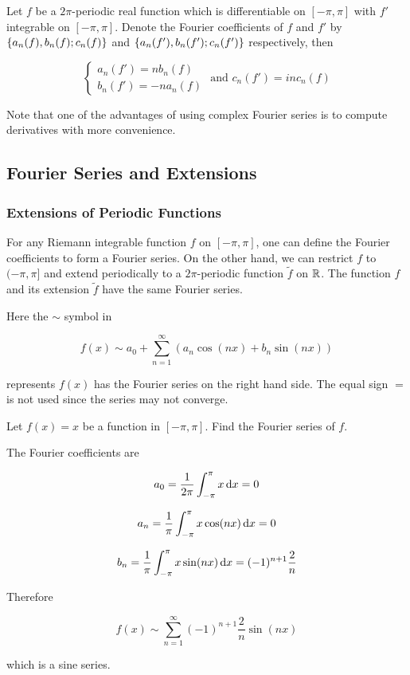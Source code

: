 \documentclass[a4paper,12pt]{article}
\begin{document}
\begin{pst}
  Let $f$ be a $2\pi$-periodic real function which is differentiable on $[-\pi,\pi]$ with $f'$ integrable on $[-\pi,\pi]$. Denote the Fourier coefficients of $f$ and $f'$ by $\left\{ a_{n}(f), b_{n}(f); c_{n}(f)\right\}$ and $\left\{ a_{n}(f'), b_{n}(f'); c_{n}(f')\right\}$ respectively, then
  
  $$\begin{cases}
    a_{n}(f')=nb_{n}(f)\\
    b_{n}(f')=-na_{n}(f)
  \end{cases}\text{ and }c_{n}(f')=inc_{n}(f)$$
\end{pst}\n

Note that one of the advantages of using complex Fourier series is to compute derivatives with more convenience.

\subsection{Fourier Series and Extensions}
\subsubsection{Extensions of Periodic Functions}
For any Riemann integrable function $f$ on $[-\pi,\pi]$, one can define the Fourier coefficients to form a Fourier series. On the other hand, we can restrict $f$ to $(-\pi,\pi]$ and extend periodically to a $2\pi$-periodic function $\tilde{f}$ on $\mathbb{R}$. The function $f$ and its extension $\tilde{f}$ have the same Fourier series.\n

Here the $\sim$ symbol in

$$f(x)\sim a_{0}+\sum_{n=1}^{\infty}(a_{n}\cos(nx)+b_{n}\sin(nx))$$\s

represents $f(x)$ has the Fourier series on the right hand side. The equal sign $=$ is not used since the series may not converge.\n

\begin{exm}
  Let $f(x)=x$ be a function in $[-\pi,\pi]$. Find the Fourier series of $f$.\n

  \ans The Fourier coefficients are

  $$a_{0}=\frac{1}{2\pi}\int_{-\pi}^{\pi}x\,\mathrm{d} x=0$$\s

  $$a_{n}=\frac{1}{\pi}\int_{-\pi}^{\pi}x\cos(nx)\,\mathrm{d} x=0$$\s

  $$b_{n}=\frac{1}{\pi}\int_{-\pi}^{\pi}x\sin(nx)\,\mathrm{d} x=(-1)^{n+1}\frac{2}{n}$$\s

  Therefore

  $$f(x)\sim\sum_{n=1}^{\infty}(-1)^{n+1}\frac{2}{n}\sin(nx)$$\s

  which is a sine series.
\end{exm}\n
\end{document}
